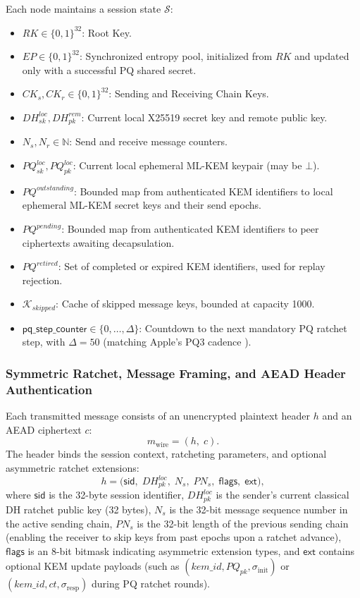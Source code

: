 \documentclass[11pt,a4paper]{article}
\theoremstyle{remark}
\theoremstyle{plain}
\newcommand{\bits}{\{0,1\}}
\begin{document}
Each node maintains a session state $\mathcal{S}$:
\begin{itemize}
  \item $RK \in \bits^{32}$: Root Key.
  \item $EP \in \bits^{32}$: Synchronized entropy pool, initialized from $RK$ and updated only
        with a successful PQ shared secret.
  \item $CK_s, CK_r \in \bits^{32}$: Sending and Receiving Chain Keys.
  \item $DH^{loc}_{sk}, DH^{rem}_{pk}$: Current local X25519 secret key and remote public key.
  \item $N_s, N_r \in \mathbb{N}$: Send and receive message counters.
  \item $PQ^{loc}_{sk}, PQ^{loc}_{pk}$: Current local ephemeral ML-KEM keypair (may be $\bot$).
  \item $PQ^{outstanding}$: Bounded map from authenticated KEM identifiers to local ephemeral
        ML-KEM secret keys and their send epochs.
  \item $PQ^{pending}$: Bounded map from authenticated KEM identifiers to peer ciphertexts
        awaiting decapsulation.
  \item $PQ^{retired}$: Set of completed or expired KEM identifiers, used for replay rejection.
  \item $\mathcal{K}_{skipped}$: Cache of skipped message keys, bounded at capacity 1000.
  \item $\mathsf{pq\_step\_counter} \in \{0, \ldots, \Delta\}$: Countdown to the next mandatory
        PQ ratchet step, with $\Delta = 50$ (matching Apple's PQ3 cadence \cite{imessage_pq3}).
\end{itemize}

\subsubsection{Symmetric Ratchet, Message Framing, and AEAD Header Authentication}
\label{sec:framing}

Each transmitted message consists of an unencrypted plaintext header $h$ and an AEAD ciphertext $c$:
\[
  m_{\mathrm{wire}} = (h,\; c).
\]
The header binds the session context, ratcheting parameters, and optional asymmetric ratchet extensions:
\[
  h = \bigl(\mathsf{sid},\; DH^{loc}_{pk},\; N_s,\; PN_s,\; \mathsf{flags},\; \mathsf{ext}\bigr),
\]
where $\mathsf{sid}$ is the 32-byte session identifier, $DH^{loc}_{pk}$ is the sender's current classical DH ratchet public key (32 bytes), $N_s$ is the 32-bit message sequence number in the active sending chain, $PN_s$ is the 32-bit length of the previous sending chain (enabling the receiver to skip keys from past epochs upon a ratchet advance), $\mathsf{flags}$ is an 8-bit bitmask indicating asymmetric extension types, and $\mathsf{ext}$ contains optional KEM update payloads (such as $(kem\_id, PQ_{pk}, \sigma_{\mathrm{init}})$ or $(kem\_id, ct, \sigma_{\mathrm{resp}})$ during PQ ratchet rounds).
\end{document}
